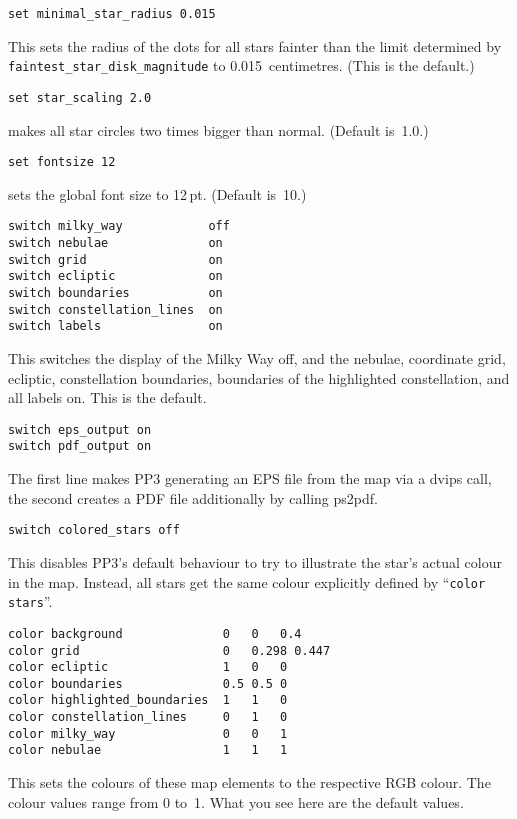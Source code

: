 \documentclass{article}
\newcommand{\PPthree}{\textsf{PP3}\xspace}
\newcommand{\subskip}{\bigskip\medskip}
\newcommand{\subsubskip}{\bigskip}
\begin{document}
\begin{multicols*}{3}
\begin{lstlisting}
set minimal_star_radius 0.015
\end{lstlisting}
This sets the radius of the dots for all stars fainter than the limit
determined by \lstinline{faintest_star_disk_magnitude} to
0.015~centimetres.  (This is the default.)\subsubskip

\begin{lstlisting}
set star_scaling 2.0
\end{lstlisting}
makes all star circles two times bigger than normal.  (Default
is~1.0.)\subsubskip

\begin{lstlisting}
set fontsize 12
\end{lstlisting}
sets the global font size to 12\,pt.  (Default is~10.)\subskip

\begin{lstlisting}
switch milky_way            off
switch nebulae              on
switch grid                 on
switch ecliptic             on
switch boundaries           on
switch constellation_lines  on
switch labels               on
\end{lstlisting}
This switches the display of the Milky Way off, and the nebulae, coordinate
grid, ecliptic, constellation boundaries, boundaries of the highlighted
constellation, and all labels on.  This is the default.\subsubskip

\begin{lstlisting}
switch eps_output on
switch pdf_output on
\end{lstlisting}
The first line makes \PPthree generating an EPS file from the map via a dvips
call, the second creates a PDF file additionally by calling ps2pdf.\subsubskip

\columnbreak
\begin{lstlisting}
switch colored_stars off
\end{lstlisting}
This disables \PPthree's default behaviour to try to illustrate the star's
actual colour in the map.  Instead, all stars get the same colour explicitly
defined by ``\lstinline{color stars}''.\subskip

\begin{lstlisting}
color background              0   0   0.4
color grid                    0   0.298 0.447
color ecliptic                1   0   0
color boundaries              0.5 0.5 0
color highlighted_boundaries  1   1   0
color constellation_lines     0   1   0
color milky_way               0   0   1
color nebulae                 1   1   1
\end{lstlisting}
This sets the colours of these map elements to the respective RGB colour.
The colour values range from 0 to~1.  What you see here are the default
values.\subsubskip


\end{multicols*}
\end{document}
